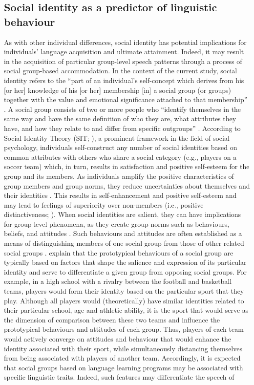 \documentclass[output=paper,colorlinks,citecolor=brown,draftmode]{langscibook}
\begin{document}
\subsection{Social identity as a predictor of linguistic behaviour}\label{sec:11:2.1}
As with other individual differences, social identity has potential implications for individuals’ language acquisition and ultimate attainment. Indeed, it may result in the acquisition of particular group-level speech patterns through a process of social group-based accommodation. In the context of the current study, social identity refers to the “part of an individual’s self-concept which derives from his [or her] knowledge of his [or her] membership [in] a social group (or groups) together with the value and emotional significance attached to that membership” \citep[63]{Tajfel1978}. A social group consists of two or more people who “identify themselves in the same way and have the same definition of who they are, what attributes they have, and how they relate to and differ from specific outgroups” \citep[251]{HoggHinkle2004}. According to Social Identity Theory (SIT; \citealt{Tajfel1978, TajfelTurner:1979}), a prominent framework in the field of social psychology, individuals self-construct any number of social identities based on common attributes with others who share a social category (e.g., players on a soccer team) which, in turn, results in satisfaction and positive self-esteem for the group and its members. As individuals amplify the positive characteristics of group members and group norms, they reduce uncertainties about themselves and their identities \citep{Hogg:2012}. This results in self-enhancement and positive self-esteem and may lead to feelings of superiority over non-members (i.e., positive distinctiveness; \citealt{Brewer1991, LeonardelliBrewer2010}). When social identities are salient, they can have implications for group-level phenomena, as they create group norms such as behaviours, beliefs, and attitudes \citep{Hogg:2018}. Such behaviours and attitudes are often established as a means of distinguishing members of one social group from those of other related social groups \citep{HoggHinkle2004}. \citet{ReicherHaslam:2010} explain that the prototypical behaviours of a social group are typically based on factors that shape the salience and expression of its particular identity and serve to differentiate a given group from opposing social groups. For example, in a high school with a rivalry between the football and basketball teams, players would form their identity based on the particular sport that they play. Although all players would (theoretically) have similar identities related to their particular school, age and athletic ability, it is the sport that would serve as the dimension of comparison between these two teams and influence the prototypical behaviours and attitudes of each group. Thus, players of each team would actively converge on attitudes and behaviour that would enhance the identity associated with their sport, while simultaneously distancing themselves from being associated with players of another team. Accordingly, it is expected that social groups based on language learning programs may be associated with specific linguistic traits. Indeed, such features may differentiate the speech of 
\end{document}
